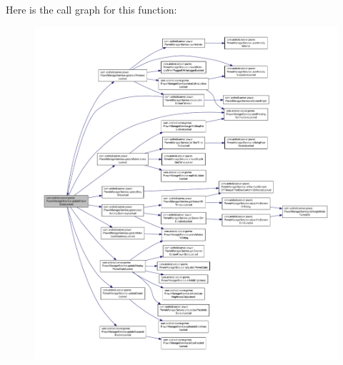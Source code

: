Here is the call graph for this function\-:
\nopagebreak
\begin{figure}[H]
\begin{center}
\leavevmode
\includegraphics[width=350pt]{classcom_1_1android_1_1server_1_1power_1_1PowerManagerService_a82137423603e85ce338a33301f627f12_cgraph}
\end{center}
\end{figure}


